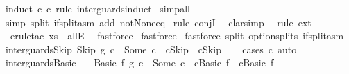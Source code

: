 \begin{isabellebody}
\ {\isacharparenleft}induct\ c{}\ c{}\ rule{\isacharcolon}\ inter{\isacharunderscore}guards{\isachardot}induct{\isacharparenright}\isanewline
{}\isamarkupfalse%
\ {\isacharparenleft}simp{\isacharunderscore}all{\isacharparenright}\isanewline
{}\isamarkupfalse%
\ {}\isanewline
{}\isamarkupfalse%
\ {\isacharparenleft}simp\ split{\isacharcolon}\ if{\isacharunderscore}split{\isacharunderscore}asm\ add{\isacharcolon}\ not{\isacharunderscore}None{\isacharunderscore}eq{\isacharparenright}\isanewline
{}\isamarkupfalse%
\ {\isacharparenleft}rule\ conjI{\isacharparenright}\isanewline
{}\isamarkupfalse%
\ \ {\isacharparenleft}clarsimp{\isacharparenright}\isanewline
{}\isamarkupfalse%
\ \ {\isacharparenleft}rule\ ext{\isacharparenright}\isanewline
{}\isamarkupfalse%
\ \ {\isacharparenleft}erule{\isacharunderscore}tac\ x{\isacharequal}s\ \ allE{\isacharparenright}{\isacharplus}\isanewline
{}\isamarkupfalse%
\ \ fastforce\isanewline
{}\isamarkupfalse%
\ fastforce\isanewline
{}\isamarkupfalse%
\ {\isacharparenleft}fastforce\ split{\isacharcolon}\ option{\isachardot}splits\ if{\isacharunderscore}split{\isacharunderscore}asm{\isacharparenright}{\isacharplus}\isanewline
{}\isamarkupfalse%
%
\endisatagproof
{\isafoldproof}%
%
\isadelimproof
\isanewline
%
\endisadelimproof
\isanewline
\isanewline
{}\isamarkupfalse%
\ inter{\isacharunderscore}guards{\isacharunderscore}Skip{\isacharcolon}\ {\isachardoublequoteopen}{\isacharparenleft}Skip\ {\isasyminter}\isactrlsub g\ c{}{\isacharparenright}\ {\isacharequal}\ Some\ c\ {\isacharequal}\ {\isacharparenleft}c{}{\isacharequal}Skip\ {\isasymand}\ c{\isacharequal}Skip{\isacharparenright}{\isachardoublequoteclose}\isanewline
%
\isadelimproof
\ \ %
\endisadelimproof
%
\isatagproof
{}\isamarkupfalse%
\ {\isacharparenleft}cases\ c{}{\isacharparenright}\ auto%
\endisatagproof
{\isafoldproof}%
%
\isadelimproof
\isanewline
%
\endisadelimproof
\isanewline
{}\isamarkupfalse%
\ inter{\isacharunderscore}guards{\isacharunderscore}Basic{\isacharcolon}\ \isanewline
\ \ {\isachardoublequoteopen}{\isacharparenleft}{\isacharparenleft}Basic\ f{\isacharparenright}\ {\isasyminter}\isactrlsub g\ c{}{\isacharparenright}\ {\isacharequal}\ Some\ c\ {\isacharequal}\ {\isacharparenleft}c{}{\isacharequal}Basic\ f\ {\isasymand}\ c{\isacharequal}Basic\ f{\isacharparenright}{\isachardoublequoteclose}\isanewline

\end{isabellebody}
